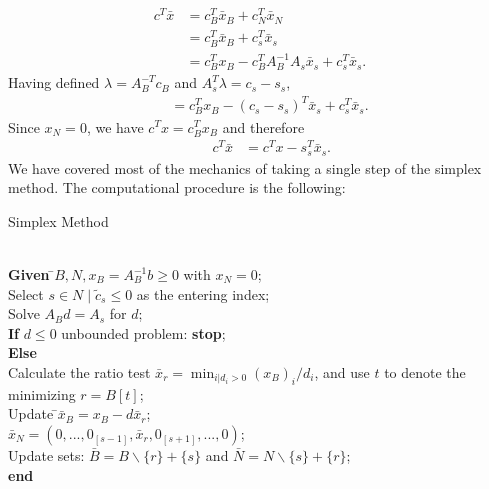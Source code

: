 \documentclass[a4paper,10 pt,titlepage,twoside]{book}
\theoremstyle{plain}
\theoremstyle{definition}
\theoremstyle{remark}
\begin{document}
\begin{align*}
c^{T}\bar{x} &=c^{T}_{B}\bar{x}_{B}+c^{T}_{N}\bar{x}_{N}\\
			 &=c_{B}^{T}\bar{x}_{B}+c^{T}_{s}\bar{x}_{s}\\
			 &=c_{B}^{T}x_{B}-c^{T}_{B}A_{B}^{-1}A_{s}\bar{x}_{s}+c_{s}^{T}\bar{x}_{s}.
\end{align*}
Having defined $ \lambda=A_{B}^{-T}c_{B}$ and $A^{T}_{s}\lambda = c_{s}-s_{s}$,
\begin{align*}
\;\;&= c^{T}_{B}x_{B}-(c_{s} -s_{s})^{T}\bar{x}_{s} +c_{s}^{T}\bar{x}_{s}.
\end{align*}
Since $x_{N}=0$, we have $c^{T}x=c^{T}_{B}x_{B}$ and therefore 
\begin{align*}
\;\;\;\;\;\;c^{T}\bar{x}& = c^{T}x - s_{s}^{T}\bar{x}_{s}.
\end{align*}
We have covered most of the mechanics of taking a single step of the simplex method. The computational procedure is the following:
\\
\begin{algorithm}[H]\caption{\label{Alg:1}Simplex Method}
\begin{tabbing}
	\\
	\textbf{Given} \=$B, N, x_{B} = A_{B}^{-1}b\geq 0$ with $x_{N}=0$;\\
	\> Select $s\in N\;|\;\widetilde{c}_{s}\leq 0$ as the entering index;\\
	\> Solve $A_{B}d = A_{s}$ for $d$;\\
	\>\textbf{If} {$d \leq 0$} unbounded problem: \textbf{stop};\\
	\>\textbf{Else} \=\\
	\>\>Calculate the ratio test $\bar{x}_{r} = \min_{i | d_{i} > 0}(x_{B})_{i}/d_{i}$, and use $t$ to denote the minimizing $r = B[t]$;\\
	\>\>Update \=$\bar{x}_{B} = x_{B}-d\bar{x}_{r}$;\\
	\>\>\>$\bar{x}_{N} = (0,...,0_{[s-1]},\bar{x}_{r},0_{[s+1]},...,0)$;\\
	\>\> Update sets: $\bar{B} = B \backslash \{r\} + \{s\}$ and $\bar{N} = N \backslash \{s\} + \{r\}$;\\
	\textbf{end}
\end{tabbing}
\end{algorithm}
\end{document}
